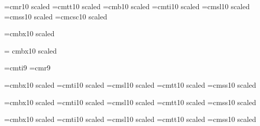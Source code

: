 \begin{\parsearg\beginxxx}
\def\node{\parsearg\nodezzz}
\def\nodezzz#1{\nodexxx [#1,]}
\def\nodexxx[#1,#2]{\gdef\lastnode{#1}}
\let\lastnode=\relax

\def\donoderef{\ifx\lastnode\relax\else
\expandafter\expandafter\expandafter\setref{\lastnode}\fi
\let\lastnode=\relax}

\def\unnumbnoderef{\ifx\lastnode\relax\else
\expandafter\expandafter\expandafter\unnumbsetref{\lastnode}\fi
\let\lastnode=\relax}

\let\refill=\relax

\let\setfilename=\comment

\def\inforef #1{\inforefzzz #1,,,,**}
\def\inforefzzz #1,#2,#3,#4**{See Info file \file{\losespace#3{}}, node `\losespace#1{}'}
\def\losespace #1{#1}



\font\tenrm=cmr10 scaled \magstephalf
\font\tentt=cmtt10 scaled \magstephalf
\font\tenbf=cmb10 scaled \magstephalf 
\font\tenit=cmti10 scaled \magstephalf
\font\tensl=cmsl10 scaled \magstephalf
\font\tensf=cmss10 scaled \magstephalf
\def\li{\sf}
\font\tensc=cmcsc10 scaled \magstephalf

\font{}=cmbx10 scaled  %
\let\deftt=\tentt
\def\df{\let\tt=\deftt \defbf}

\font\titlerm = cmbx10 scaled 

\font\indit=cmti9 \font\indrm=cmr9
\def\indbf{\indrm} \def\indsl{\indit}
\def\indexfonts{\let\it=\indit \let\sl=\indsl \let\bf=\indbf \let\rm=\indrm}

\font\chaprm=cmbx10 scaled 
\font\chapit=cmti10 scaled 
\font\chapsl=cmsl10 scaled 
\font\chaptt=cmtt10 scaled 
\font\chapsf=cmss10 scaled 
\let\chapbf=\chaprm

\font\secrm=cmbx10 scaled 
\font\secit=cmti10 scaled 
\font\secsl=cmsl10 scaled 
\font\sectt=cmtt10 scaled 
\font\secsf=cmss10 scaled 
\let\secbf=\secrm

\font\ssecrm=cmbx10 scaled 
\font\ssecit=cmti10 scaled 
\font\ssecsl=cmsl10 scaled 
\font\ssectt=cmtt10 scaled 
\font\ssecsf=cmss10 scaled 
\let\ssecbf=\ssecrm


\end{\parsearg\beginxxx}
